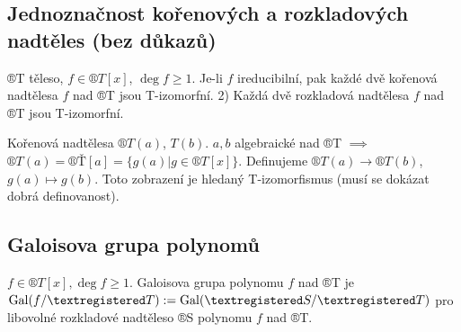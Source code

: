 \documentclass[12pt]{article}                   %
\begin{document}
    \subsection{Jednoznačnost kořenových a rozkladových nadtěles (bez důkazů)}
        \begin{veta}
            ®T těleso, $f \in ®T[x]$, $\deg f ≥ 1$. Je-li $f$ ireducibilní, pak každé dvě kořenová nadtělesa $f$ nad ®T jsou T-izomorfní. 2) Každá dvě rozkladová nadtělesa $f$ nad ®T jsou T-izomorfní.

            \begin{dukazin}[Nástřel]
                Kořenová nadtělesa $®T(a)$, $T(b)$. $a, b$ algebraické nad ®T $\implies$ $®T(a) = ®Ť[a] = \{g(a) | g \in ®T[x]\}$. Definujeme $®T(a) \rightarrow ®T(b)$, $g(a) \mapsto g(b)$. Toto zobrazení je hledaný T-izomorfismus (musí se dokázat dobrá definovanost).
            \end{dukazin}
        \end{veta}

    \subsection{Galoisova grupa polynomů}
        \begin{definice}
            $f \in ®T[x], \deg f ≥ 1$. Galoisova grupa polynomu $f$ nad ®T je $\Gal(f/®T) := \Gal(®S/®T)$ pro libovolné rozkladové nadtěleso ®S polynomu $f$ nad ®T.
        \end{definice}
\end{document}

